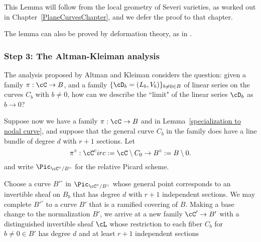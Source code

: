 This Lemma will follow from the local geometry of Severi varieties, as worked out in Chapter~\ref{PlaneCurvesChapter}, and we defer the proof to that chapter.

The lemma can also be proved by deformation theory, as in . 
%
%
%

\subsubsection{Step 3: The Altman-Kleiman analysis}

The analysis proposed by Altman and Kleiman considers the question: given a family $\pi : \cC \to B$, and a family $\{ \cD_b = (L_b, V_b)\}_{b \neq 0 \in B}$ of linear series on the curves $C_b$ with $b \neq 0$, how can we describe the ``limit" of the linear series $\cD_b$ as $b \to 0$? 

Suppose now we have a family $\pi : \cC \to B$ and in Lemma~\ref{specialization to nodal curve}, and suppose that the general curve $C_b$ in the family does have a line bundle  of degree $d$ with $r+1$ sections. Let 
$$
\pi^\circ: \cC^circ := \cC \setminus C_0\to B^\circ := B\setminus 0.
$$
and write $\Pic_{\cC^\circ/B^\circ}$ for the relative Picard scheme.

Choose a curve $B'^\circ$ in $\Pic_{\cC^\circ/B^\circ}$ whose general point corresponds
to an invertible sheaf on $B_b$ that has degree $d$ with $r+1$ independent sections.  We may complete $B'^\circ$ to a curve $B'$ that is a ramified covering of $B$. Making a base change to the normalization $B'$,  we arrive at a new family $\cC'\to B'$ with a distinguished invertible sheaf $\cL$ whose restriction to each fiber $C_b$ for $b \neq 0 \in B'$ has degree $d$ and at least $r+1$ independent sections 

